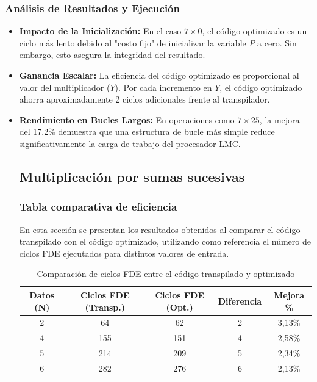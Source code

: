 \documentclass[12pt,a4paper]{article}
\begin{document}
\subsubsection{Análisis de Resultados y Ejecución}
\begin{itemize}
    \item \textbf{Impacto de la Inicialización:} En el caso $7 \times 0$, el código optimizado es un ciclo más lento debido al "costo fijo" de inicializar la variable $P$ a cero. Sin embargo, esto asegura la integridad del resultado.
    \item \textbf{Ganancia Escalar:} La eficiencia del código optimizado es proporcional al valor del multiplicador ($Y$). Por cada incremento en $Y$, el código optimizado ahorra aproximadamente 2 ciclos adicionales frente al transpilador.
    \item \textbf{Rendimiento en Bucles Largos:} En operaciones como $7 \times 25$, la mejora del 17.2\% demuestra que una estructura de bucle más simple reduce significativamente la carga de trabajo del procesador LMC.
\subsection{Multiplicación por sumas sucesivas}

\subsubsection{Tabla comparativa de eficiencia}

En esta sección se presentan los resultados obtenidos al comparar el código transpilado con el código optimizado,
utilizando como referencia el número de ciclos FDE ejecutados para distintos valores de entrada.

\begin{table}[H]
\centering
\begin{tabular}{|c|c|c|c|c|}
\hline
\textbf{Datos (N)} & \textbf{Ciclos FDE (Transp.)} & \textbf{Ciclos FDE (Opt.)} & \textbf{Diferencia} & \textbf{Mejora \%} \\
\hline
2 & 64  & 62  & 2 & 3,13\% \\
4 & 155 & 151 & 4 & 2,58\% \\
5 & 214 & 209 & 5 & 2,34\% \\
6 & 282 & 276 & 6 & 2,13\% \\
\hline
\end{tabular}
\caption{Comparación de ciclos FDE entre el código transpilado y optimizado}
\end{table}


\end{itemize}
\end{document}
